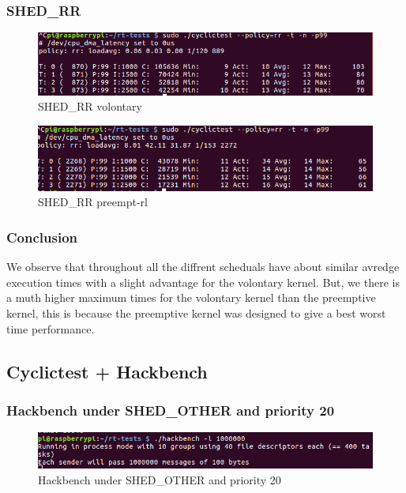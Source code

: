 \documentclass[10pt,a4paper]{article}
\begin{document}
\subsubsection{SHED\_RR}
\begin{figure}[h]
\includegraphics[width=16cm]{Voluntary-RR-WithoutHackbench.png}
\caption{SHED\_RR volontary}
\end{figure}
\begin{figure}[H]
\includegraphics[width=16cm]{Preempt-RR-WithoutHackbench.png}
\caption{SHED\_RR preempt-rl}
\end{figure}
\subsubsection{Conclusion}
We observe that throughout all the diffrent scheduals have about similar avredge execution times with a slight advantage for the volontary kernel. But, we there is a muth higher maximum times for the volontary kernel than the preemptive kernel, this is because the preemptive kernel was designed to give a best worst time performance.
\subsection{Cyclictest + Hackbench}
\subsubsection{Hackbench under SHED\_OTHER and priority 20}
\begin{figure}[H]
\includegraphics[width=16cm]{Volontary-other-Hackbench-p20.png}
\caption{Hackbench under SHED\_OTHER and priority 20}
\end{figure}
\end{document}

